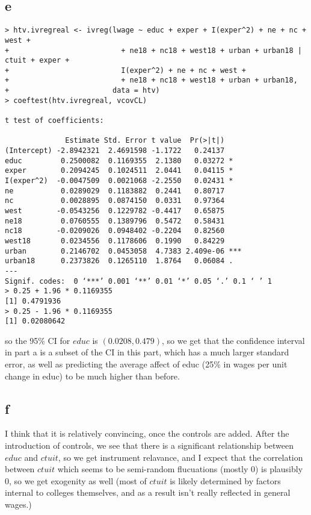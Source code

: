 \documentclass[12pt,letterpaper]{article}
\theoremstyle{definition}
\begin{document}
\subsection*{e}

\begin{Verbatim}[fontsize=\small]
> htv.ivregreal <- ivreg(lwage ~ educ + exper + I(exper^2) + ne + nc + west +
+                          + ne18 + nc18 + west18 + urban + urban18 | ctuit + exper +
+                          I(exper^2) + ne + nc + west +
+                          + ne18 + nc18 + west18 + urban + urban18,
+                        data = htv)
> coeftest(htv.ivregreal, vcovCL)

t test of coefficients:

              Estimate Std. Error t value  Pr(>|t|)
(Intercept) -2.8942321  2.4691598 -1.1722   0.24137
educ         0.2500082  0.1169355  2.1380   0.03272 *
exper        0.2094245  0.1024511  2.0441   0.04115 *
I(exper^2)  -0.0047509  0.0021068 -2.2550   0.02431 *
ne           0.0289029  0.1183882  0.2441   0.80717
nc           0.0028895  0.0874150  0.0331   0.97364
west        -0.0543256  0.1229782 -0.4417   0.65875
ne18         0.0760555  0.1389796  0.5472   0.58431
nc18        -0.0209026  0.0948402 -0.2204   0.82560
west18       0.0234556  0.1178606  0.1990   0.84229
urban        0.2146702  0.0453058  4.7383 2.409e-06 ***
urban18      0.2373826  0.1265110  1.8764   0.06084 .
---
Signif. codes:  0 ‘***’ 0.001 ‘**’ 0.01 ‘*’ 0.05 ‘.’ 0.1 ‘ ’ 1
> 0.25 + 1.96 * 0.1169355
[1] 0.4791936
> 0.25 - 1.96 * 0.1169355
[1] 0.02080642
\end{Verbatim}
so the 95\% CI for $educ$ is $(0.0208, 0.479)$, so we get that the confidence interval in part a is a subset of the CI in this part, which has a much larger standard error, as well as predicting the average affect of educ (25\% in wages per unit change in educ) to be much higher than before.

\subsection*{f}

I think that it is relatively convincing, once the controls are added. After the introduction of controls, we see that there is a significant relationship between $educ$ and $ctuit$, so we get instrument relavance, and I expect that the correlation between $ctuit$ which seems to be semi-random flucuations (mostly 0) is plausibly 0, so we get exogenity as well (most of $ctuit$ is likely determined by factors internal to colleges themselves, and as a result isn't really reflected in general wages.)
\end{document}
